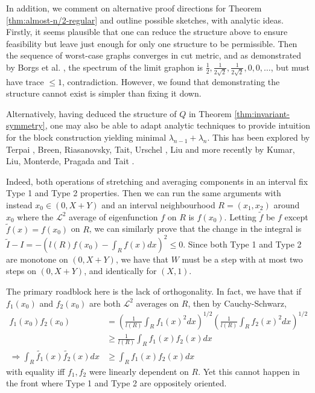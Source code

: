 \documentclass[11pt]{article}
\begin{document}
In addition, we comment on alternative proof directions for Theorem \ref{thm:almost-n/2-regular} and outline possible sketches, with analytic ideas. Firstly, it seems plausible that one can reduce the structure above to ensure feasibility but leave just enough for only one structure to be permissible. Then the sequence of worst-case graphs converges in cut metric, and as demonstrated by Borgs et al. \cite{borgs2008graphon}, the spectrum of the limit graphon is $\frac12, \frac{1}{2\sqrt{2}}, \frac{1}{2\sqrt{2}}, 0, 0, \dots$, but must have trace $\le 1$, contradiction. However, we found that demonstrating the structure cannot exist is simpler than fixing it down.

Alternatively, having deduced the structure of $Q$ in Theorem \ref{thm:invariant-symmetry}, one may also be able to adapt analytic techniques to provide intuition for the block construction yielding minimal $\lambda_{n-1} + \lambda_n$. This has been explored by Terpai \cite{terpai2011analytic}, Breen, Riasanovsky, Tait, Urschel \cite{breen2022}, Liu \cite{liu2024} and more recently by Kumar, Liu, Monterde, Pragada and Tait \cite{kumar2026}. 

Indeed, both operations of stretching and averaging components in an interval fix Type 1 and Type 2 properties. Then we can run the same arguments with instead $x_0 \in (0, X+Y)$ and an interval neighbourhood $R = (x_1, x_2)$ around $x_0$ where the $\mathcal{L}^2$ average of eigenfunction $f$ on $R$ is $f(x_0)$. Letting $\tilde{f}$ be $f$ except $\tilde{f}(x) = f(x_0)$ on $R$, we can similarly prove that the change in the integral is $\tilde{I} - I = -(l(R) f(x_0) - \int_R f(x) dx)^2 \le 0$. Since both Type 1 and Type 2 are monotone on $(0, X+Y)$, we have that $W$ must be a step with at most two steps on $(0, X+Y)$, and identically for $(X, 1)$. 

The primary roadblock here is the lack of orthogonality. In fact, we have that if $f_1(x_0)$ and $f_2(x_0)$ are both $\mathcal{L}^2$ averages on $R$, then by Cauchy-Schwarz, 
\begin{align*}
    f_1(x_0) f_2(x_0) &= \left(\frac{1}{l(R)} \int_R f_1(x)^2 dx\right)^{1/2} \left(\frac{1}{l(R)} \int_R f_2(x)^2 dx\right)^{1/2} \\
    &\ge \frac{1}{l(R)} \int_R f_1(x) f_2(x) dx \\
    \Rightarrow \int_R \tilde{f_1}(x) \tilde{f_2}(x) dx &\ge \int_R f_1(x) f_2(x) dx
\end{align*}
with equality iff $f_1, f_2$ were linearly dependent on $R$. Yet this cannot happen in the front where Type 1 and Type 2 are oppositely oriented. \\
\end{document}

